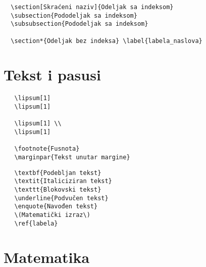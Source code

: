 \begin{verbatim}
  \section[Skraćeni naziv]{Odeljak sa indeksom}
  \subsection{Pododeljak sa indeksom}
  \subsubsection{Pododeljak sa indeksom}

  \section*{Odeljak bez indeksa} \label{labela_naslova}
\end{verbatim}

\pagebreak

\section*{Tekst i pasusi}

\begin{verbatim}
   \lipsum[1]
   \lipsum[1]

   \lipsum[1] \\
   \lipsum[1]

   \footnote{Fusnota}
   \marginpar{Tekst unutar margine}
\end{verbatim}

\begin{verbatim}
   \textbf{Podebljan tekst}
   \textit{Italiciziran tekst}
   \texttt{Blokovski tekst}
   \underline{Podvučen tekst}
   \enquote{Navođen tekst}
   \(Matematički izraz\)
   \ref{labela}
\end{verbatim}

\pagebreak

\section*{Matematika}

